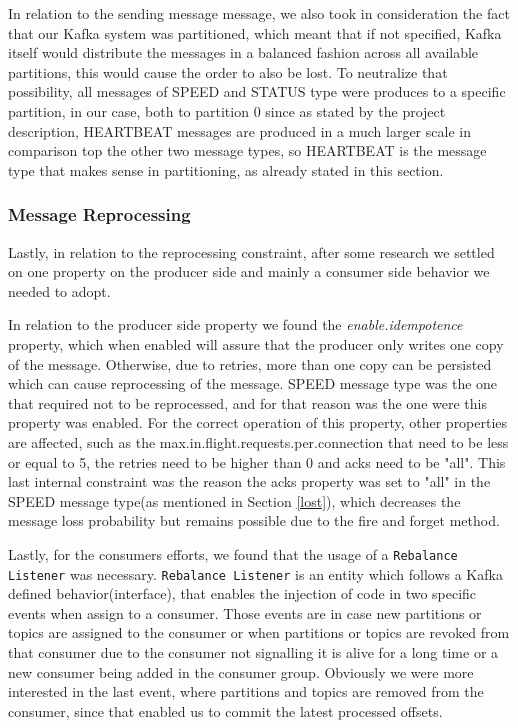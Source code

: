 \documentclass[12pt]{article}
\begin{document}
In relation to the sending message message, we also took in consideration the fact that our Kafka system was partitioned, which meant that if not specified, Kafka itself would distribute the messages in a balanced fashion across all available partitions, this would cause the order to also be lost. To neutralize that possibility, all messages of SPEED and STATUS type were produces to a specific partition, in our case, both to partition 0 since as stated by the project description, HEARTBEAT messages are produced in a much larger scale in comparison top the other two message types, so HEARTBEAT is the message type that makes sense in partitioning, as already stated in this section.

\subsubsection{Message Reprocessing}\label{reprocessing}
Lastly, in relation to the reprocessing constraint, after some research we settled on one property on the producer side and mainly a consumer side behavior we needed to adopt.

In relation to the producer side property we found the \textit{enable.idempotence} property, which when enabled will assure that the producer only writes one copy of the message. Otherwise, due to retries, more than one copy can be persisted which can cause reprocessing of the message. SPEED message type was the one that required not to be reprocessed, and for that reason was the one were this property was enabled. For the correct operation of this property, other properties are affected, such as the max.in.flight.requests.per.connection that need to be less or equal to 5, the retries need to be higher than 0 and acks need to be "all". This last internal constraint was the reason the acks property was set to "all" in the SPEED message type(as mentioned in Section \ref{lost}), which decreases the message loss probability but remains possible due to the fire and forget method.

Lastly, for the consumers efforts, we found that the usage of a \texttt{Rebalance Listener} was necessary. \texttt{Rebalance Listener} is an entity which follows a Kafka defined behavior(interface), that enables the injection of code in two specific events when assign to a consumer. Those events are in case new partitions or topics are assigned to the consumer or when partitions or topics are revoked from that consumer due to the consumer not signalling it is alive for a long time or a new consumer being added in the consumer group. Obviously we were more interested in the last event, where partitions and topics are removed from the consumer, since that enabled us to commit the latest processed offsets.
\end{document}
